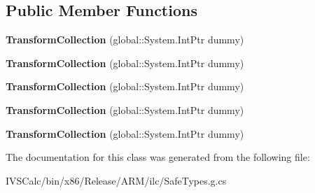 \subsection*{Public Member Functions}
\begin{DoxyCompactItemize}
\item 
\mbox{\label{class_windows_1_1_u_i_1_1_xaml_1_1_media_1_1_transform_collection_a70321fc8ff15138ed88e14b7f2450149}} 
{\bfseries Transform\+Collection} (global\+::\+System.\+Int\+Ptr dummy)
\item 
\mbox{\label{class_windows_1_1_u_i_1_1_xaml_1_1_media_1_1_transform_collection_a70321fc8ff15138ed88e14b7f2450149}} 
{\bfseries Transform\+Collection} (global\+::\+System.\+Int\+Ptr dummy)
\item 
\mbox{\label{class_windows_1_1_u_i_1_1_xaml_1_1_media_1_1_transform_collection_a70321fc8ff15138ed88e14b7f2450149}} 
{\bfseries Transform\+Collection} (global\+::\+System.\+Int\+Ptr dummy)
\item 
\mbox{\label{class_windows_1_1_u_i_1_1_xaml_1_1_media_1_1_transform_collection_a70321fc8ff15138ed88e14b7f2450149}} 
{\bfseries Transform\+Collection} (global\+::\+System.\+Int\+Ptr dummy)
\item 
\mbox{\label{class_windows_1_1_u_i_1_1_xaml_1_1_media_1_1_transform_collection_a70321fc8ff15138ed88e14b7f2450149}} 
{\bfseries Transform\+Collection} (global\+::\+System.\+Int\+Ptr dummy)
\end{DoxyCompactItemize}


The documentation for this class was generated from the following file\+:\begin{DoxyCompactItemize}
\item 
I\+V\+S\+Calc/bin/x86/\+Release/\+A\+R\+M/ilc/Safe\+Types.\+g.\+cs\end{DoxyCompactItemize}
